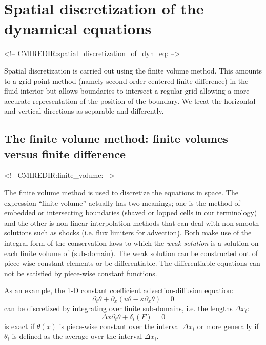 
\section{Spatial discretization of the dynamical equations}
\begin{rawhtml}
<!-- CMIREDIR:spatial_discretization_of_dyn_eq: -->
\end{rawhtml}

Spatial discretization is carried out using the finite volume
method. This amounts to a grid-point method (namely second-order
centered finite difference) in the fluid interior but allows
boundaries to intersect a regular grid allowing a more accurate
representation of the position of the boundary. We treat the
horizontal and vertical directions as separable and differently.




\subsection{The finite volume method: finite volumes versus finite difference}
\begin{rawhtml}
<!-- CMIREDIR:finite_volume: -->
\end{rawhtml}



The finite volume method is used to discretize the equations in
space. The expression ``finite volume'' actually has two meanings; one
is the method of embedded or intersecting boundaries (shaved or lopped
cells in our terminology) and the other is non-linear interpolation
methods that can deal with non-smooth solutions such as shocks
(i.e. flux limiters for advection). Both make use of the integral form
of the conservation laws to which the {\it weak solution} is a
solution on each finite volume of (sub-domain). The weak solution can
be constructed out of piece-wise constant elements or be
differentiable. The differentiable equations can not be satisfied by
piece-wise constant functions.

As an example, the 1-D constant coefficient advection-diffusion
equation:
\begin{displaymath}
\partial_t \theta + \partial_x ( u \theta - \kappa \partial_x \theta ) = 0
\end{displaymath}
can be discretized by integrating over finite sub-domains, i.e.
the lengths $\Delta x_i$:
\begin{displaymath}
\Delta x \partial_t \theta + \delta_i ( F ) = 0
\end{displaymath}
is exact if $\theta(x)$ is piece-wise constant over the interval
$\Delta x_i$ or more generally if $\theta_i$ is defined as the average
over the interval $\Delta x_i$.

